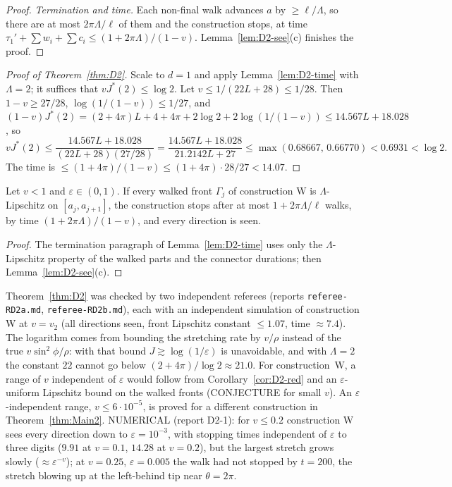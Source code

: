 \begin{proof}
\emph{Termination and time.} Each non-final walk advances $a$ by $\ge\ell/\Lambda$, so there are at most $2\pi\Lambda/\ell$ of them and the
construction stops, at time $\tau_1'+\sum w_i+\sum c_i\le(1+2\pi\Lambda)/(1-v)$. Lemma~\ref{lem:D2-see}(c) finishes the proof.
\end{proof}

\begin{proof}[Proof of Theorem~\ref{thm:D2}]
Scale to $d=1$ and apply Lemma~\ref{lem:D2-time} with $\Lambda=2$; it suffices that $vJ^*(2)\le\log2$. Let $v\le1/(22L+28)\le1/28$.
Then $1-v\ge27/28$, $\log(1/(1-v))\le1/27$, and
$(1-v)J^*(2)=(2+4\pi)L+4+4\pi+2\log2+2\log(1/(1-v))\le14.567L+18.028$, so
\[
vJ^*(2)\le\frac{14.567L+18.028}{(22L+28)(27/28)}=\frac{14.567L+18.028}{21.2142L+27}\le\max(0.68667,\,0.66770)<0.6931<\log2 .
\]
The time is $\le(1+4\pi)/(1-v)\le(1+4\pi)\cdot28/27<14.07$.
\end{proof}

\begin{corollary}[D2.6: reduction]\label{cor:D2-red}
Let $v<1$ and $\varepsilon\in(0,1)$. If every walked front $\Gamma_j$ of construction W is $\Lambda$-Lipschitz on $[a_j,a_{j+1}]$,
the construction stops after at most $1+2\pi\Lambda/\ell$ walks, by time $(1+2\pi\Lambda)/(1-v)$, and every direction is seen.
\end{corollary}
\begin{proof}
The termination paragraph of Lemma~\ref{lem:D2-time} uses only the $\Lambda$-Lipschitz property of the walked parts and the connector
durations; then Lemma~\ref{lem:D2-see}(c).
\end{proof}

\begin{remark}\label{rem:D2}
Theorem~\ref{thm:D2} was checked by two independent referees (reports \texttt{referee-RD2a.md}, \texttt{referee-RD2b.md}), each with
an independent simulation of construction W at $v=v_2$ (all directions seen, front Lipschitz constant $\le1.07$, time $\approx7.4$).
The logarithm comes from bounding the stretching rate by $v/\rho$ instead of the true $v\sin^2\!\phi/\rho$: with that bound
$J\gtrsim\log(1/\varepsilon)$ is unavoidable, and with $\Lambda=2$ the constant $22$ cannot go below $(2+4\pi)/\log2\approx21.0$.
For construction~W, a range of $v$ independent of $\varepsilon$ would follow from Corollary~\ref{cor:D2-red} and an
$\varepsilon$-uniform Lipschitz bound on the walked fronts (CONJECTURE for small $v$). An $\varepsilon$-independent range,
$v\le6\cdot10^{-5}$, is proved for a different construction in Theorem~\ref{thm:Main2}. NUMERICAL (report D2-1): for $v\le0.2$ construction W sees every direction down to
$\varepsilon=10^{-3}$, with stopping times independent of $\varepsilon$ to three digits ($9.91$ at $v=0.1$, $14.28$ at $v=0.2$), but the
largest stretch grows slowly ($\approx\varepsilon^{-v}$); at $v=0.25$, $\varepsilon=0.005$ the walk had not stopped by $t=200$, the
stretch blowing up at the left-behind tip near $\theta=2\pi$.
\end{remark}
